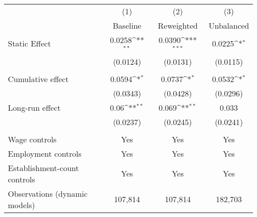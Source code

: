{
\def\sym#1{\ifmmode^{#1}\else\(^{#1}\)\fi}
\begin{tabular}{l*{3}{c}}
\hline\hline
          &\multicolumn{1}{c}{(1)}&\multicolumn{1}{c}{(2)}&\multicolumn{1}{c}{(3)}\\
          &\multicolumn{1}{c}{Baseline}&\multicolumn{1}{c}{Reweighted}&\multicolumn{1}{c}{Unbalanced}\\
\hline
Static Effect&   0.0258\sym{**} &   0.0390\sym{***}&   0.0225\sym{*}  \\
          & (0.0124)         & (0.0131)         & (0.0115)         \\
\hline
\vspace{-2mm}&                  &                  &                  \\
Cumulative effect&0.0594\sym{*}         &0.0737\sym{*}         &0.0532\sym{*}         \\
          & (0.0343)         & (0.0428)         & (0.0296)         \\
Long-run effect&0.06\sym{**}         &0.069\sym{**}         &    0.033         \\
          & (0.0237)         & (0.0245)         & (0.0241)         \\
\hline    &                  &                  &                  \\
Wage controls&      Yes         &      Yes         &      Yes         \\
Employment controls&      Yes         &      Yes         &      Yes         \\
Establishment-count controls&      Yes         &      Yes         &      Yes         \\
Observations (dynamic models)&  107,814         &  107,814         &  182,703         \\
\hline\hline
\end{tabular}
}
